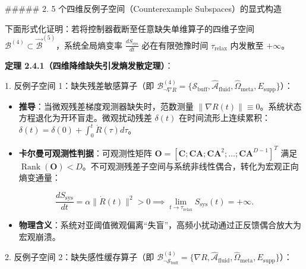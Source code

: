 \documentclass[11pt,a4paper,oneside]{ctexart}
\begin{document}
\#\#\#\#\# 2. 5 个四维反例子空间（Counterexample Subspaces）的显式构造


下面形式化证明：若将控制器截断至任意缺失单维算子的四维子空间 $\mathcal{B}^{(4)} \subset \vec{\mathcal{B}}^{(5)}$，系统全局熵变率 $\frac{d S_{\text{sys}}}{dt}$ 必在有限弛豫时间 $\tau_{\text{relax}}$ 内发散至 $+\infty$。


\textbf{定理 2.4.1（四维降维缺失引发熵发散定理）}：


1. \textit{}反例子空间 1：缺失残差敏感算子（即 $\mathcal{B}_{\neg \nabla R}^{(4)} = \{ \mathcal{S}_{\text{buff}}, \hat{\mathcal{A}}_{\text{fluid}}, \hat{\Omega}_{\text{meta}}, E_{\text{supp}} \}$）\textit{}：

\begin{itemize}\item \textbf{推导}：当微观残差梯度观测器缺失时，范数测量 $\|\nabla R(t)\| \equiv 0$。系统状态方程退化为开环盲走。微观扰动残差 $\delta(t)$ 在时间流形上连续累积：$\delta(t) = \delta(0) + \int_0^t \dot{R}(\tau) d\tau$。\end{itemize}
\begin{itemize}\item \textbf{卡尔曼可观测性判据}：可观测性矩阵 $\mathbf{O} = [\mathbf{C}; \mathbf{CA}; \mathbf{CA}^2; \dots; \mathbf{CA}^{D-1}]^T$ 满足 $\operatorname{Rank}(\mathbf{O}) < D$。不可观测残差子空间与系统非线性偶合，转化为宏观正向熵变通量：\end{itemize}
\begin{equation}
\frac{d S_{\text{sys}}}{dt} = \alpha \|\dot{R}(t)\|^2 > 0 \implies \lim_{t \to \tau_{\text{relax}}} S_{\text{sys}}(t) = +\infty.
\end{equation}
\begin{itemize}\item \textbf{物理含义}：系统对亚阈值微观偏离“失盲”，高频小扰动通过正反馈偶合放大为宏观崩溃。\end{itemize}

2. \textit{}反例子空间 2：缺失感性缓存算子（即 $\mathcal{B}_{\neg \mathcal{S}_{\text{buff}}}^{(4)} = \{ \nabla R, \hat{\mathcal{A}}_{\text{fluid}}, \hat{\Omega}_{\text{meta}}, E_{\text{supp}} \}$）\textit{}：
\end{document}
